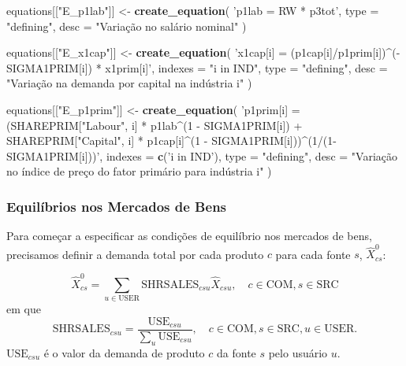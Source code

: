 \documentclass[12pt,twoside]{article}
\newenvironment{Shaded}{\begin{snugshade}}{\end{snugshade}}
\newcommand{\DataTypeTok}[1]{\textcolor[rgb]{0.13,0.29,0.53}{#1}}
\newcommand{\KeywordTok}[1]{\textcolor[rgb]{0.13,0.29,0.53}{\textbf{#1}}}
\newcommand{\NormalTok}[1]{#1}
\newcommand{\StringTok}[1]{\textcolor[rgb]{0.31,0.60,0.02}{#1}}
\let\oldShaded\Shaded
\let\endoldShaded\endShaded
\renewenvironment{Shaded}{\footnotesize\oldShaded}{\endoldShaded}
\begin{document}
\begin{Shaded}
\begin{Highlighting}[]
\NormalTok{equations[[}\StringTok{"E_p1lab"}\NormalTok{]] <-}\StringTok{ }\KeywordTok{create_equation}\NormalTok{(}
  \StringTok{'p1lab = RW * p3tot'}\NormalTok{,}
  \DataTypeTok{type =} \StringTok{"defining"}\NormalTok{,}
  \DataTypeTok{desc =} \StringTok{"Variação no salário nominal"}
\NormalTok{)}

\NormalTok{equations[[}\StringTok{"E_x1cap"}\NormalTok{]] <-}\StringTok{ }\KeywordTok{create_equation}\NormalTok{(}
  \StringTok{'x1cap[i] = (p1cap[i]/p1prim[i])^(-SIGMA1PRIM[i]) * x1prim[i]'}\NormalTok{,}
  \DataTypeTok{indexes =} \StringTok{"i in IND"}\NormalTok{,}
  \DataTypeTok{type =} \StringTok{"defining"}\NormalTok{,}
  \DataTypeTok{desc =} \StringTok{"Variação na demanda por capital na indústria i"}
\NormalTok{)}

\NormalTok{equations[[}\StringTok{"E_p1prim"}\NormalTok{]] <-}\StringTok{ }\KeywordTok{create_equation}\NormalTok{(}
  \StringTok{'p1prim[i] = (SHAREPRIM["Labour", i] * p1lab^(1 - SIGMA1PRIM[i]) +}
\StringTok{    SHAREPRIM["Capital", i] * p1cap[i]^(1 - SIGMA1PRIM[i]))^(1/(1-SIGMA1PRIM[i]))'}\NormalTok{,}
  \DataTypeTok{indexes =} \KeywordTok{c}\NormalTok{(}\StringTok{'i in IND'}\NormalTok{),}
  \DataTypeTok{type =} \StringTok{"defining"}\NormalTok{,}
  \DataTypeTok{desc =} \StringTok{"Variação no índice de preço do fator primário para indústria i"}
\NormalTok{)}
\end{Highlighting}
\end{Shaded}

\hypertarget{equiluxedbrios-nos-mercados-de-bens}{%
\subsubsection{Equilíbrios nos Mercados de
Bens}\label{equiluxedbrios-nos-mercados-de-bens}}

Para começar a especificar as condições de equilíbrio nos mercados de
bens, precisamos definir a demanda total por cada produto \(c\) para
cada fonte \(s\), \(\hat{X}^0_{cs}\):

\[\hat{X}^0_{cs} = \sum_{u \in \text{USER}} \text{SHRSALES}_{csu} \hat{X}_{csu}, \quad  c \in \text{COM}, s \in \text{SRC}\]
em que
\[\text{SHRSALES}_{csu} = \frac{\text{USE}_{csu}}{\sum_u\text{USE}_{csu}}, \quad  c \in \text{COM}, s \in \text{SRC}, u \in \text{USER}.\]
\(\text{USE}_{csu}\) é o valor da demanda de produto \(c\) da fonte
\(s\) pelo usuário \(u\).
\end{document}
